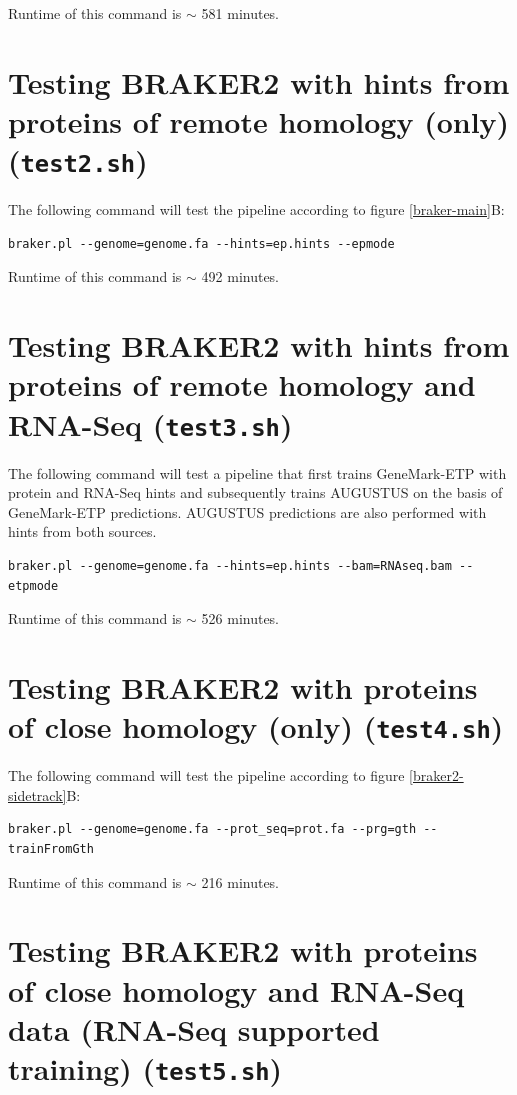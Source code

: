 \documentclass[a4paper,10pt]{report}
\begin{document}
Runtime of this command is $\sim$ 581 minutes.

\section{Testing BRAKER2 with hints from proteins of remote homology (only) (\texttt{test2.sh})}

The following command will test the pipeline according to figure \ref{braker-main}B:

\begin{verbatim}
braker.pl --genome=genome.fa --hints=ep.hints --epmode
\end{verbatim}

Runtime of this command is $\sim$ 492 minutes.

\section{Testing BRAKER2 with hints from proteins of remote homology and RNA-Seq (\texttt{test3.sh})}

The following command will test a pipeline that first trains GeneMark-ETP with protein and RNA-Seq hints and subsequently trains AUGUSTUS on the basis of GeneMark-ETP predictions. AUGUSTUS predictions are also performed with hints from both sources.

\begin{verbatim}
braker.pl --genome=genome.fa --hints=ep.hints --bam=RNAseq.bam --etpmode
\end{verbatim}

Runtime of this command is $\sim$ 526 minutes.

\section{Testing BRAKER2 with proteins of close homology (only) (\texttt{test4.sh})}

The following command will test the pipeline according to figure \ref{braker2-sidetrack}B:

\begin{verbatim}
braker.pl --genome=genome.fa --prot_seq=prot.fa --prg=gth --trainFromGth
\end{verbatim}

Runtime of this command is $\sim$ 216 minutes.

\section{Testing BRAKER2 with proteins of close homology and RNA-Seq data (RNA-Seq supported training) (\texttt{test5.sh})}
\end{document}
